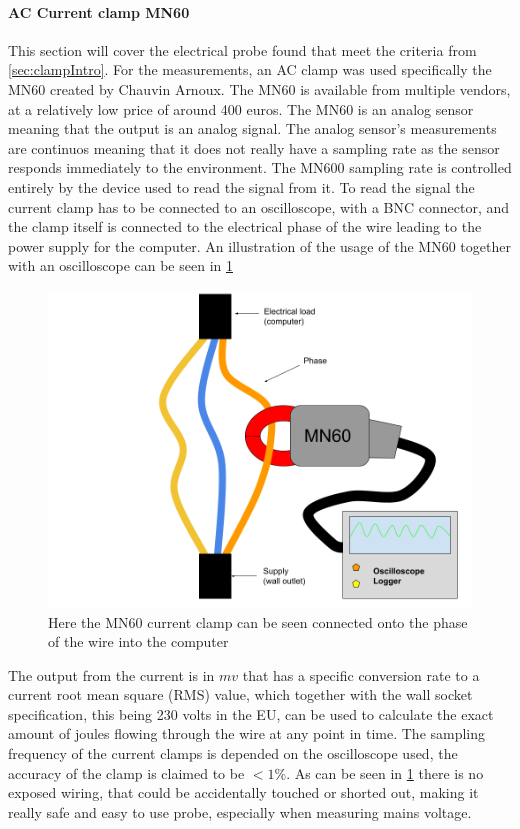 \paragraph*{AC Current clamp MN60}

This section will cover the electrical probe found that meet the criteria from \ref{sec:clampIntro}. For the measurements, an AC clamp was used specifically the MN60 created by Chauvin Arnoux. The MN60 is available from multiple vendors, at a relatively low price of around 400 euros. The MN60 is an analog sensor meaning that the output is an analog signal. The analog sensor's measurements are continuos meaning that it does not really have a sampling rate as the sensor responds immediately to the environment\cite{agarwal2005foundations}. The MN600 sampling rate is controlled entirely by the device used to read the signal from it. To read the signal the current clamp has to be connected to an oscilloscope, with a BNC connector\cite{ClampDoc}, and the clamp itself is connected to the electrical phase of the wire leading to the power supply for the computer. An illustration of the usage of the MN60 together with an oscilloscope can be seen in \cref{fig:clampSetup}
\begin{figure}[h!]
    \centering
    \includegraphics*[scale=0.25]{figures/CLAMP.png}
    \caption{Here the MN60 current clamp can be seen connected onto the phase of the wire into the computer}
    \label{fig:clampSetup}
\end{figure}
The output from the current is in $mv$ that has a specific conversion rate to a current root mean square (RMS) value, which together with the wall socket specification, this being 230 volts in the EU\cite{sik}, can be used to calculate the exact amount of joules flowing through the wire at any point in time. The sampling frequency of the current clamps is depended on the oscilloscope used, the accuracy of the clamp is claimed to be $<1\%$\cite{ClampDoc}. As can be seen in \ref{fig:clampSetup} there is no exposed wiring, that could be accidentally touched or shorted out, making it really safe and easy to use probe, especially when measuring mains voltage.


